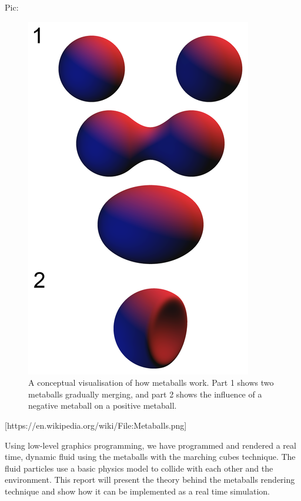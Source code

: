 \documentclass{article}
\begin{document}
    Pic:
            \begin{figure}[ht]
                \includegraphics[width=\linewidth]{img/metaballs-concept.png}
                \caption{A conceptual visualisation of how metaballs work. Part 1 shows two metaballs gradually merging, and part 2 shows the influence of a negative metaball on a positive metaball.}
                \label{fig:metaballs-concept}
            \end{figure}
    [https://en.wikipedia.org/wiki/File:Metaballs.png]

    Using low-level graphics programming, we have programmed and rendered a real time, dynamic fluid using the metaballs with the marching cubes technique. The fluid particles use a basic physics model to collide with each other and the environment.
    This report will present the theory behind the metaballs rendering technique and show how it can be implemented as a real time simulation.
\end{document}
